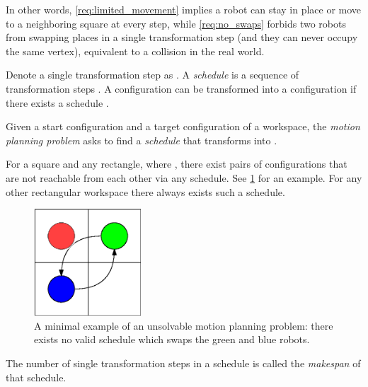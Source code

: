 In other words, \cref{req:limited_movement} implies a robot can stay in place or move to a neighboring square at every step, while \cref{req:no_swaps} forbids two robots from swapping places in a single transformation step (and they can never occupy the same vertex), equivalent to a collision in the real world.

Denote a single transformation step as . A \emph{schedule} is a sequence of transformation steps . A configuration  can be transformed into a configuration  if there exists a schedule .


\begin{definition}\label{def:motion_planning_problem}
	Given a start configuration  and a target configuration  of a workspace, the \emph{motion planning problem} asks to find a \emph{schedule} that transforms  into .
\end{definition}

\begin{remark}\label{remark:reachability}
	For a  square and any  rectangle, where , there exist pairs of configurations that are not reachable from each other via any schedule. See \cref{fig:reachability} for an example. For any other rectangular workspace there always exists such a schedule. 
\end{remark}
\begin{figure}[h]
	\centering
	\includegraphics[width=4cm]{include/impossible_2x2.eps}
	\caption{A minimal example of an unsolvable motion planning problem: there exists no valid schedule which swaps the green and blue robots.}\label{fig:reachability}
\end{figure}

\begin{definition}\label{def:makespan}
	The number of single transformation steps in a schedule is called the \emph{makespan} of that schedule.
\end{definition}

